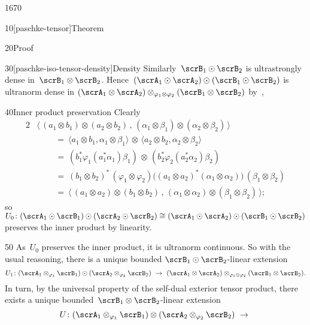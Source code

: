 \begin{parsec}{1670}
\begin{point}{10}[paschke-tensor]{Theorem}
\begin{point}{20}{Proof}
\begin{point}{30}[paschke-iso-tensor-density]{Density}
Similarly~$\scrB_1 \odot \scrB_2$
    is ultrastrongly dense in~$\scrB_1 \otimes \scrB_2$.
Hence~$(\scrA_1 \odot \scrA_2) \odot 
    (\scrB_1 \odot \scrB_2)$ is ultranorm dense
    in
    $(\scrA_1 \otimes \scrA_2) \otimes_{\varphi_1 \otimes \varphi_2}
    (\scrB_1 \otimes \scrB_2)$
        by~,
\end{point}
\begin{point}{40}{Inner product preservation}%
Clearly
\begin{alignat*}{2}
    &
    \bigl\langle\,
    (a_1 \otimes b_1)\otimes (a_2 \otimes b_2)\,,\,
    (\alpha_1 \otimes \beta_1 )\otimes( \alpha_2 \otimes \beta_2)
    \,\bigr\rangle \\
    & \qquad\ = \ 
    \langle a_1 \otimes b_1 , \alpha_1 \otimes \beta_1 \rangle \,\otimes\,
    \langle a_2 \otimes b_2 , \alpha_2 \otimes \beta_2 \rangle \\
    & \qquad\ = \ 
    (b_1^* \varphi_1( a_1^* \alpha_1) \beta_1)
    \,\otimes \,
    (b_2^* \varphi_2( a_2^* \alpha_2) \beta_2) \\
    & \qquad \ = \ 
    (b_1 \otimes b_2)^* \,(\varphi_1 \otimes \varphi_2)
    \bigl((a_1 \otimes a_2)^* (\alpha_1 \otimes \alpha_2)\bigr)
    \,(\beta_1 \otimes \beta_2) \\
    & \qquad \ = \ 
    \bigl\langle\,
    (a_1\otimes a_2)\otimes (b_1 \otimes b_2) \,,\,
    (\alpha_1\otimes \alpha_2)\otimes (\beta_1 \otimes \beta_2)
    \,\bigr\rangle;
\end{alignat*}
so $U_0 \colon (\scrA_1 \odot \scrB_1) \odot (\scrA_2 \odot \scrB_2) \cong
(\scrA_1 \odot \scrA_2) \odot (\scrB_1 \odot \scrB_2) $
preserves the inner product by linearity.
\end{point}
\begin{point}{50}%
As~$U_0$ preserves the inner product,
    it is ultranorm continuous.
So with the usual reasoning, there is a unique bounded
    $\scrB_1 \odot \scrB_2$-linear extension
\begin{equation*}
    U_1\colon (\scrA_1 \otimes_{\varphi_1} \scrB_1) \odot (\scrA_2 \otimes_{\varphi_2} \scrB_2) \ \to \ 
        (\scrA_1 \otimes \scrA_2) \otimes_{\varphi_1 \otimes \varphi_2} (\scrB_1 \otimes \scrB_2).
\end{equation*}
In turn, by the universal property of the self-dual exterior tensor product,
    there exists a unique
    bounded~$\scrB_1\otimes \scrB_2$-linear extension
\begin{equation*}
    U\colon (\scrA_1 \otimes_{\varphi_1} \scrB_1) \otimes (\scrA_2 \otimes_{\varphi_2} \scrB_2) \ \to\ 

\end{equation*}
\end{point}
\end{point}
\end{point}
\end{parsec}
